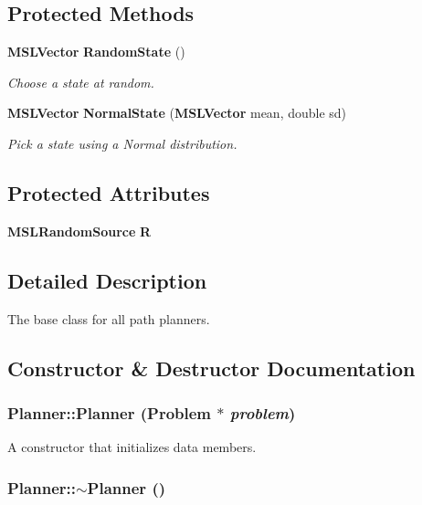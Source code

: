 \subsection*{Protected Methods}
\begin{CompactItemize}
\item 
{\bf MSLVector} {\bf Random\-State} ()
\begin{CompactList}\small\item\em Choose a state at random.\item\end{CompactList}\item 
{\bf MSLVector} {\bf Normal\-State} ({\bf MSLVector} mean, double sd)
\begin{CompactList}\small\item\em Pick a state using a Normal distribution.\item\end{CompactList}\end{CompactItemize}
\subsection*{Protected Attributes}
\begin{CompactItemize}
\item 
{\bf MSLRandom\-Source} {\bf R}
\end{CompactItemize}


\subsection{Detailed Description}
The base class for all path planners.



\subsection{Constructor \& Destructor Documentation}
\subsubsection{\setlength{\rightskip}{0pt plus 5cm}Planner::Planner ({\bf Problem} $\ast$ {\em problem})}\label{classPlanner_a0}


A constructor that initializes data members.

\subsubsection{\setlength{\rightskip}{0pt plus 5cm}Planner::$\sim$Planner ()}\label{classPlanner_a1}




